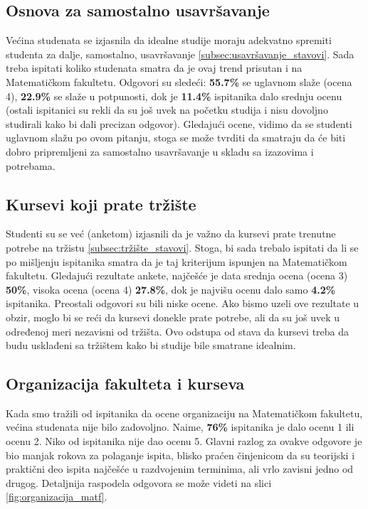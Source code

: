 \documentclass[a4paper]{article}
\begin{document}
\subsection{Osnova za samostalno usavršavanje}
\label{subsec:usavršavanje_iskustva}
Većina studenata se izjasnila da idealne studije moraju adekvatno spremiti studenta za dalje, samostalno, usavršavanje \ref{subsec:usavršavanje_stavovi}. Sada treba ispitati koliko studenata smatra da je ovaj trend prisutan i na Matematičkom fakultetu.
Odgovori su sledeći: \textbf{55.7\%} se uglavnom slaže (ocena 4), \textbf{22.9\%} se slaže u potpunosti, dok je \textbf{11.4\%} ispitanika dalo srednju ocenu (ostali ispitanici su rekli da su još uvek na početku studija i nisu dovoljno studirali kako bi dali precizan odgovor). Gledajući ocene, vidimo da se studenti uglavnom slažu po ovom pitanju, stoga se može tvrditi da smatraju da će biti dobro pripremljeni za samostalno usavršavanje u skladu sa izazovima i potrebama.


\subsection{Kursevi koji prate tržište}
\label{subsec:tržište_iskustva}

Studenti su se već (anketom) izjasnili da je važno da kursevi prate trenutne potrebe na tržistu \ref{subsec:tržište_stavovi}. Stoga, bi sada trebalo ispitati da li se po mišljenju ispitanika smatra da je taj kriterijum ispunjen na Matematičkom fakultetu. Gledajući rezultate ankete, najčešće je data srednja ocena (ocena 3) \textbf{50\%}, visoka ocena (ocena 4) \textbf{27.8\%}, dok je najvišu ocenu dalo samo \textbf{4.2\%} ispitanika. Preostali odgovori su bili niske ocene. Ako bismo uzeli ove rezultate u obzir, moglo bi se reći da kursevi donekle prate potrebe, ali da su još uvek u određenoj meri nezavisni od tržišta. Ovo odstupa od stava da kursevi treba da budu usklađeni sa tržištem kako bi studije bile smatrane idealnim.

\subsection{Organizacija fakulteta i kurseva}
\label{subsec:organizacija_iskustva}

Kada smo tražili od ispitanika da ocene organizaciju na Matematičkom fakultetu, većina studenata nije bilo zadovoljno. Naime, \textbf{76\%} ispitanika je dalo ocenu 1 ili ocenu 2. Niko od ispitanika nije dao ocenu 5. Glavni razlog za ovakve odgovore je bio manjak rokova za polaganje ispita, blisko praćen činjenicom da su teorijski i praktični deo ispita najčešće u razdvojenim terminima, ali vrlo zavisni jedno od drugog. Detaljnija raspodela odgovora se može videti na slici \ref{fig:organizacija_matf}.
\end{document}
